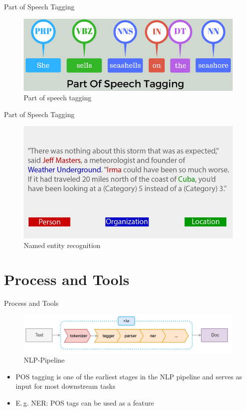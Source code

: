 \begin{frame}{Part of Speech Tagging}{}
	\begin{figure}
		\includegraphics[scale=0.4]{img/pos_tagging}
		\caption{Part of speech tagging}
	\end{figure}
\end{frame}


\begin{frame}{Part of Speech Tagging}{}
	\begin{figure}
		\includegraphics[scale=0.35]{img/ner}
		\caption{Named entity recognition}
	\end{figure}
\end{frame}

\section{Process and Tools}

\begin{frame}{Process and Tools}{}
	\begin{figure}
		\includegraphics[scale=0.4]{img/nlp_pipeline}
		\caption{NLP-Pipeline}
	\end{figure}

	\begin{itemize}
		\item POS tagging is one of the earliest stages in the NLP pipeline and serves as input for most
			downstream tasks
		\item E.\,g. NER: POS tags can be used as a feature 
	\end{itemize}
\end{frame}


